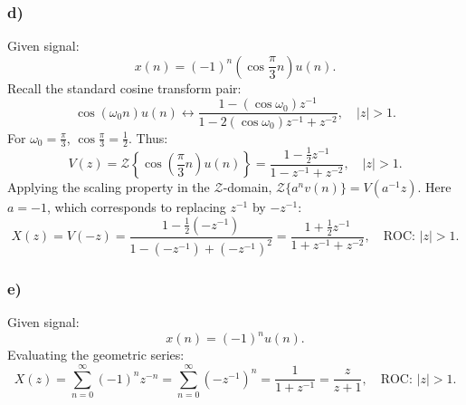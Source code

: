 \documentclass[12pt,a4paper]{article}
\begin{document}
\subsubsection*{d)}
Given signal:
\begin{equation}
    x(n) = (-1)^n \left(\cos \frac{\pi}{3} n\right) u(n).
\end{equation}
Recall the standard cosine transform pair:
\begin{equation}
    \cos(\omega_0 n) u(n) \longleftrightarrow \frac{1 - (\cos\omega_0) z^{-1}}{1 - 2(\cos\omega_0) z^{-1} + z^{-2}}, \quad |z| > 1.
\end{equation}
For $\omega_0 = \frac{\pi}{3}$, $\cos \frac{\pi}{3} = \frac{1}{2}$. Thus:
\begin{equation}
    V(z) = \mathcal{Z}\left\{ \cos\left(\frac{\pi}{3} n\right) u(n) \right\} = \frac{1 - \frac{1}{2}z^{-1}}{1 - z^{-1} + z^{-2}}, \quad |z| > 1.
\end{equation}
Applying the scaling property in the $\mathcal{Z}$-domain, $\mathcal{Z}\{a^n v(n)\} = V(a^{-1}z)$. Here $a = -1$, which corresponds to replacing $z^{-1}$ by $-z^{-1}$:
\begin{equation}
    X(z) = V(-z) = \frac{1 - \frac{1}{2}(-z^{-1})}{1 - (-z^{-1}) + (-z^{-1})^2} = \frac{1 + \frac{1}{2}z^{-1}}{1 + z^{-1} + z^{-2}}, \quad \text{ROC: } |z| > 1.
\end{equation}

\subsubsection*{e)}
Given signal:
\begin{equation}
    x(n) = (-1)^n u(n).
\end{equation}
Evaluating the geometric series:
\begin{equation}
    X(z) = \sum_{n=0}^{\infty} (-1)^n z^{-n} = \sum_{n=0}^{\infty} (-z^{-1})^n = \frac{1}{1 + z^{-1}} = \frac{z}{z + 1}, \quad \text{ROC: } |z| > 1.
\end{equation}
\end{document}
